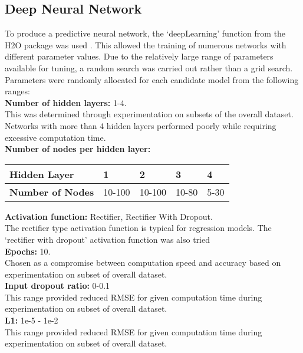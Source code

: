 \documentclass[journal]{IEEEtran}
\begin{document}
\subsection{Deep Neural Network}
To produce a predictive neural network, the ‘deepLearning’ function from the H2O package was used \cite{h2o2017,h2o2015}. This allowed the training of numerous networks with different parameter values. Due to the relatively large range of parameters available for tuning, a random search was carried out rather than a grid search. Parameters were randomly allocated for each candidate model from the following ranges:\\


\textbf{Number of hidden layers:} 1-4. \\
This was determined through experimentation on subsets of the overall dataset. Networks with more than 4 hidden layers performed poorly while requiring excessive computation time.\\

\textbf{Number of nodes per hidden layer:}
\begin{center}
\begin{tabular}{ | m{4em} | m{1cm}|m{1cm}|m{1cm}|m{1cm}|} 
\hline
\textbf{Hidden Layer} & 1 & 2 & 3 & 4 \\ 
\hline
\textbf{Number of Nodes}  & 10-100 & 10-100 & 10-80 & 5-30 \\ 
 \hline
\end{tabular}
\end{center}


\textbf{Activation function:} Rectifier, Rectifier With Dropout. \\
The rectifier type activation function is typical for regression models. The ‘rectifier with dropout’ activation function was also tried\cite{Kuo2016}\\

\textbf{Epochs:} 10. \\
Chosen as a compromise between computation speed and accuracy based on experimentation on subset of overall dataset.\\

\textbf{Input dropout ratio:} 0-0.1\\
This range provided reduced RMSE for given computation time during experimentation on subset of overall dataset.\\

\textbf{L1:} 1e-5 - 1e-2\\
This range provided reduced RMSE for given computation time during experimentation on subset of overall dataset.\\
\end{document}
